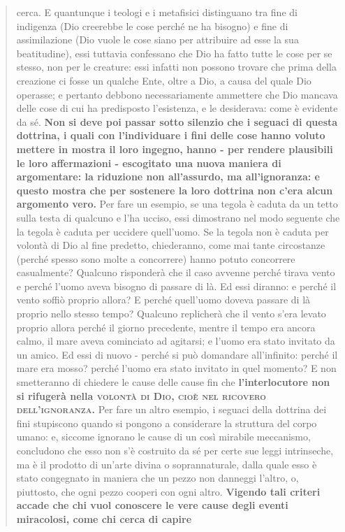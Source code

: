 \begin{quotation}
	cerca. E quantunque i teologi e i metafisici distinguano tra fine di indigenza (Dio creerebbe
	le cose perché ne ha bisogno) e fine di assimilazione (Dio vuole le cose siano per attribuire
	ad esse la sua beatitudine), essi tuttavia confessano che Dio ha fatto tutte le cose per se
	stesso, non per le creature: essi infatti non possono trovare che prima della creazione ci
	fosse un qualche Ente, oltre a Dio, a causa del quale Dio operasse; e pertanto debbono necessariamente ammettere che Dio mancava delle cose di cui ha predisposto l’esistenza, e le
	desiderava: come è evidente da sé. \textbf{Non si deve poi passar sotto silenzio che i seguaci di
	questa dottrina, i quali con l’individuare i fini delle cose hanno voluto mettere in mostra il
	loro ingegno, hanno - per rendere plausibili le loro affermazioni - escogitato una nuova maniera di argomentare: la riduzione non all’assurdo, ma all’ignoranza: e questo mostra
	che per sostenere la loro dottrina non c’era alcun argomento vero.} Per fare un esempio, se
	una tegola è caduta da un tetto sulla testa di qualcuno e l’ha ucciso, essi dimostrano nel
	modo seguente che la tegola è caduta per uccidere quell’uomo. Se la tegola non è caduta
	per volontà di Dio al fine predetto, chiederanno, come mai tante circostanze (perché spesso
	sono molte a concorrere) hanno potuto concorrere casualmente? Qualcuno risponderà che
	il caso avvenne perché tirava vento e perché l’uomo aveva bisogno di passare di là. Ed essi
	diranno: e perché il vento soffiò proprio allora? E perché quell’uomo doveva passare di là
	proprio nello stesso tempo? Qualcuno replicherà che il vento s’era levato proprio allora
	perché il giorno precedente, mentre il tempo era ancora calmo, il mare aveva cominciato
	ad agitarsi; e l’uomo era stato invitato da un amico. Ed essi di nuovo - perché si può domandare all’infinito: perché il mare era mosso? perché l’uomo era stato invitato in quel
	momento? E non smetteranno di chiedere le cause delle cause fin che \textbf{l’interlocutore non si
	rifugerà nella \textsc{volontà di Dio, cioè nel ricovero dell’ignoranza.}} Per fare un altro esempio, i
	seguaci della dottrina dei fini stupiscono quando si pongono a considerare la struttura del
	corpo umano: e, siccome ignorano le cause di un così mirabile meccanismo, concludono
	che esso non s’è costruito da sé per certe sue leggi intrinseche, ma è il prodotto di un’arte
	divina o soprannaturale, dalla quale esso è stato congegnato in maniera che un pezzo non
	danneggi l’altro, o, piuttosto, che ogni pezzo cooperi con ogni altro. \textbf{Vigendo tali criteri accade che chi vuol conoscere le vere cause degli eventi miracolosi, come chi cerca di capire
}
\end{quotation}
